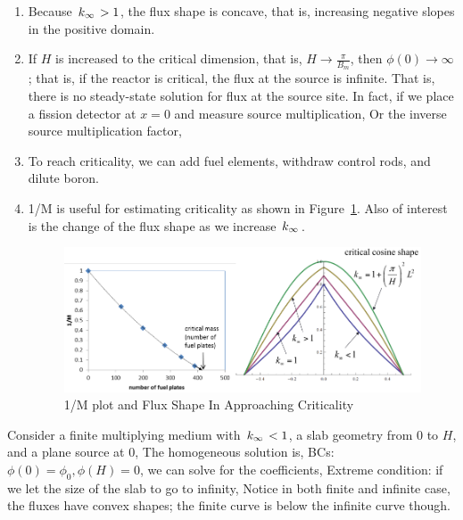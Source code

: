 \documentclass{school-22.211-notes}
\begin{document}
\begin{enumerate}
\item Because $\left. k_{\infty} \right. > 1$, the flux shape is concave, that is, increasing negative slopes in the positive domain.  
\item If $H$ is increased to the critical dimension, that is, $H \to \frac{\pi}{B_m}$, then $\phi(0) \to \infty$; that is, if the reactor is critical, the flux at the source is infinite. That is, there is no steady-state solution for flux at the source site. In fact, if we place a fission detector at $x=0$ and measure source multiplication, 
  Or the inverse source multiplication factor, 
\item To reach criticality, we can add fuel elements, withdraw control rods, and dilute boron. 
\item 1/M is useful for estimating criticality as shown in Figure~\ref{approach-critical}. Also of interest is the change of the flux shape as we increase $\left. k_{\infty} \right.$. 
  \begin{figure}
    \centering
    \includegraphics[width=5in]{images/dfs/approach-critical.png}
    \caption{1/M plot and Flux Shape In Approaching Criticality}\label{approach-critical}
  \end{figure}
\end{enumerate}

\clearpage
{}
Consider a finite multiplying medium with $\left. k_{\infty} \right. < 1$, a slab geometry from $0$ to $H$, and a plane source at $0$, 
The homogeneous solution is, 
BCs: $\phi(0) = \phi_0, \phi(H) = 0$, we can solve for the coefficients, 
Extreme condition: if we let the size of the slab to go to infinity, 
Notice in both finite and infinite case, the fluxes have convex shapes; the finite curve is below the infinite curve though. 
\end{document}
